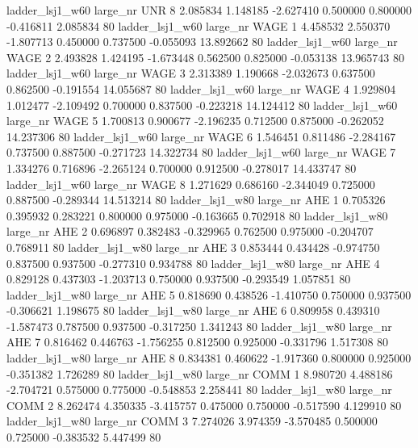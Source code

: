     ladder_lsj1_w60   large_nr      UNR                 8  2.085834  1.148185  -2.627410 0.500000 0.800000 -0.416811    2.085834 80
    ladder_lsj1_w60   large_nr     WAGE                 1  4.458532  2.550370  -1.807713 0.450000 0.737500 -0.055093   13.892662 80
    ladder_lsj1_w60   large_nr     WAGE                 2  2.493828  1.424195  -1.673448 0.562500 0.825000 -0.053138   13.965743 80
    ladder_lsj1_w60   large_nr     WAGE                 3  2.313389  1.190668  -2.032673 0.637500 0.862500 -0.191554   14.055687 80
    ladder_lsj1_w60   large_nr     WAGE                 4  1.929804  1.012477  -2.109492 0.700000 0.837500 -0.223218   14.124412 80
    ladder_lsj1_w60   large_nr     WAGE                 5  1.700813  0.900677  -2.196235 0.712500 0.875000 -0.262052   14.237306 80
    ladder_lsj1_w60   large_nr     WAGE                 6  1.546451  0.811486  -2.284167 0.737500 0.887500 -0.271723   14.322734 80
    ladder_lsj1_w60   large_nr     WAGE                 7  1.334276  0.716896  -2.265124 0.700000 0.912500 -0.278017   14.433747 80
    ladder_lsj1_w60   large_nr     WAGE                 8  1.271629  0.686160  -2.344049 0.725000 0.887500 -0.289344   14.513214 80
    ladder_lsj1_w80   large_nr      AHE                 1  0.705326  0.395932   0.283221 0.800000 0.975000 -0.163665    0.702918 80
    ladder_lsj1_w80   large_nr      AHE                 2  0.696897  0.382483  -0.329965 0.762500 0.975000 -0.204707    0.768911 80
    ladder_lsj1_w80   large_nr      AHE                 3  0.853444  0.434428  -0.974750 0.837500 0.937500 -0.277310    0.934788 80
    ladder_lsj1_w80   large_nr      AHE                 4  0.829128  0.437303  -1.203713 0.750000 0.937500 -0.293549    1.057851 80
    ladder_lsj1_w80   large_nr      AHE                 5  0.818690  0.438526  -1.410750 0.750000 0.937500 -0.306621    1.198675 80
    ladder_lsj1_w80   large_nr      AHE                 6  0.809958  0.439310  -1.587473 0.787500 0.937500 -0.317250    1.341243 80
    ladder_lsj1_w80   large_nr      AHE                 7  0.816462  0.446763  -1.756255 0.812500 0.925000 -0.331796    1.517308 80
    ladder_lsj1_w80   large_nr      AHE                 8  0.834381  0.460622  -1.917360 0.800000 0.925000 -0.351382    1.726289 80
    ladder_lsj1_w80   large_nr     COMM                 1  8.980720  4.488186  -2.704721 0.575000 0.775000 -0.548853    2.258441 80
    ladder_lsj1_w80   large_nr     COMM                 2  8.262474  4.350335  -3.415757 0.475000 0.750000 -0.517590    4.129910 80
    ladder_lsj1_w80   large_nr     COMM                 3  7.274026  3.974359  -3.570485 0.500000 0.725000 -0.383532    5.447499 80
